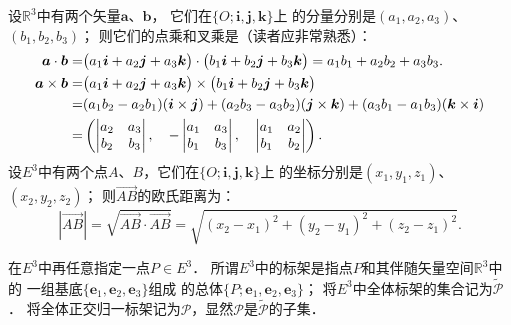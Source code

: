 设$\mathbb{R}^3$中有两个矢量$\boldsymbol{a}$、$\boldsymbol{b}$，
它们在$\{O;\boldsymbol{i},\boldsymbol{j},\boldsymbol{k}\}$上
的分量分别是$(a_1,a_2,a_3)$、$(b_1,b_2,b_3)$；
则它们的{\heiti 点乘}和{\heiti 叉乘}是（读者应非常熟悉）：
\begin{align*}
    \boldsymbol{a}\cdot \boldsymbol{b} = & \bigl(a_1 \boldsymbol{i} +a_2 \boldsymbol{j}+a_3 \boldsymbol{k}\bigr) \cdot
    \bigl(b_1 \boldsymbol{i} +b_2 \boldsymbol{j}+b_3 \boldsymbol{k}\bigr)= a_1 b_1 +a_2 b_2+a_3b_3  . \\
    \boldsymbol{a}\times \boldsymbol{b} = & \bigl(a_1 \boldsymbol{i} +a_2 \boldsymbol{j}+a_3 \boldsymbol{k}\bigr) \times
    \bigl(b_1 \boldsymbol{i} +b_2 \boldsymbol{j}+b_3 \boldsymbol{k}\bigr)  \notag\\
    =&(a_1 b_2 - a_2 b_1) (\boldsymbol{i}\times \boldsymbol{j})
     +(a_2 b_3 - a_3 b_2) (\boldsymbol{j}\times \boldsymbol{k})
     +(a_3 b_1 -a _1 b_3) (\boldsymbol{k}\times \boldsymbol{i} )\\
    =& \left( \begin{vmatrix} a_2 & a_3 \\ b_2 & b_3 \end{vmatrix},\quad
    -\begin{vmatrix} a_1 & a_3 \\ b_1 & b_3 \end{vmatrix},\quad
    \begin{vmatrix} a_1 & a_2 \\ b_1 & b_2 \end{vmatrix}    \right) .
\end{align*}
设$E^3$中有两个点$A$、$B$，它们在$\{O;\boldsymbol{i},\boldsymbol{j},\boldsymbol{k}\}$上
的坐标分别是$(x_1,y_1,z_1)$、$(x_2,y_2,z_2)$；
则$\overrightarrow{AB}$的{\heiti 欧氏距离}为：
\begin{equation}
    \left|\overrightarrow{AB}\right|=\sqrt{\overrightarrow{AB} \cdot \overrightarrow{AB}}
    =\sqrt{(x_2 - x_1)^2 + (y_2-y_1)^2 + (z_2-z_1)^2} .
\end{equation}



在$E^3$中再任意指定一点$P\in E^3$．
所谓$E^3$中的{\heiti 标架}是指点$P$和其伴随矢量空间$\mathbb{R}^3$中的
一组基底$\{\boldsymbol{e}_1,\boldsymbol{e}_2,\boldsymbol{e}_3\}$组成
的总体$\{P;\boldsymbol{e}_1,\boldsymbol{e}_2,\boldsymbol{e}_3\}$；
将$E^3$中全体标架的集合记为$\widetilde{\mathscr{P}}$．
将全体正交归一标架记为$\mathscr{P}$，显然$\mathscr{P}$是$\widetilde{\mathscr{P}}$的子集．

